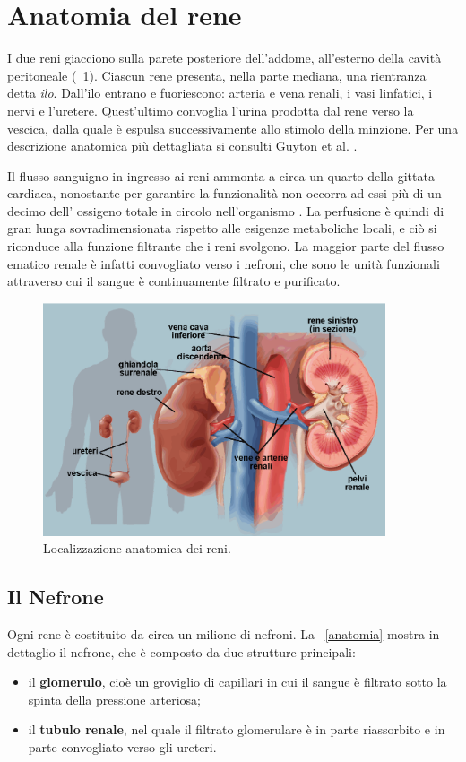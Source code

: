 \section{Anatomia del rene}
I due reni giacciono sulla parete posteriore dell'addome, all'esterno della cavità peritoneale (\figurename~\ref{anathomy1}). Ciascun rene presenta, nella parte mediana, una rientranza detta \textit{ilo}. Dall'ilo entrano e fuoriescono: arteria e vena renali, i vasi linfatici, i nervi e l'uretere. Quest'ultimo convoglia l'urina prodotta dal rene verso la vescica, dalla quale è espulsa successivamente allo stimolo della minzione. Per una descrizione anatomica più dettagliata si consulti Guyton et al. \cite{guyton}.

Il flusso sanguigno in ingresso ai reni ammonta a circa un quarto della gittata cardiaca, nonostante per garantire la funzionalità non occorra ad essi più di un decimo dell' ossigeno totale in circolo nell'organismo \cite{burton}. La perfusione è quindi di gran lunga sovradimensionata rispetto alle esigenze metaboliche locali, e ciò si riconduce alla funzione filtrante che i reni svolgono. La maggior parte del flusso ematico renale è infatti convogliato verso i nefroni, che sono le unità funzionali attraverso cui il sangue è continuamente filtrato e purificato.
\begin{figure}[htb]
	\centering
		\includegraphics[width=0.9\textwidth]{immagini/anathomy1.eps}
		\caption{Localizzazione anatomica dei reni.}\label{anathomy1}
\end{figure}

\subsection{Il Nefrone \cite{guyton}}
Ogni rene è costituito da circa un milione di nefroni. La \figurename~\ref{anatomia} mostra in dettaglio il nefrone, che è composto da due strutture principali: 
\begin{itemize}
	\item il \textbf{glomerulo}, cioè un groviglio di capillari in cui il sangue è filtrato sotto la spinta della pressione arteriosa;
	\item il \textbf{tubulo renale}, nel quale il filtrato glomerulare è in parte riassorbito e in parte convogliato verso gli ureteri.
\end{itemize}

